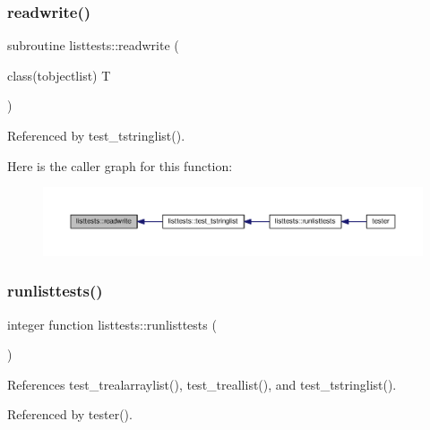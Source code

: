\subsubsection{\texorpdfstring{readwrite()}{readwrite()}}
{\footnotesize\ttfamily subroutine listtests\+::readwrite (\begin{DoxyParamCaption}\item[{class(tobjectlist)}]{T }\end{DoxyParamCaption})}



Referenced by test\+\_\+tstringlist().

Here is the caller graph for this function\+:
\nopagebreak
\begin{figure}[H]
\begin{center}
\leavevmode
\includegraphics[width=350pt]{namespacelisttests_a8eab128313dcd99ed099b3b3bc4905f3_icgraph}
\end{center}
\end{figure}
\mbox{\label{namespacelisttests_aff7cca94d4e34d14a24b9712b35e46f0}} 
\subsubsection{\texorpdfstring{runlisttests()}{runlisttests()}}
{\footnotesize\ttfamily integer function listtests\+::runlisttests (\begin{DoxyParamCaption}{ }\end{DoxyParamCaption})}



References test\+\_\+trealarraylist(), test\+\_\+treallist(), and test\+\_\+tstringlist().



Referenced by tester().


